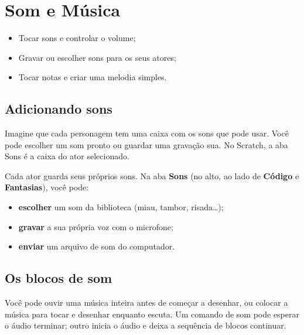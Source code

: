 \chapter{Som e Música}

\begin{objetivos}
\begin{itemize}
\item Tocar sons e controlar o volume;
\item Gravar ou escolher sons para os seus atores;
\item Tocar notas e criar uma melodia simples.
\end{itemize}
\end{objetivos}

\section{Adicionando sons}

\begin{pensaassim}
Imagine que cada personagem tem uma caixa com os sons que pode usar. Você pode escolher um som pronto ou guardar uma gravação sua. No Scratch, a aba Sons é a caixa do ator selecionado.
\end{pensaassim}

Cada ator guarda seus próprios sons. Na aba \textbf{Sons} (no alto, ao lado de \textbf{Código} e \textbf{Fantasias}), você pode:

\begin{itemize}
\item \textbf{escolher} um som da biblioteca (miau, tambor, risada\ldots);
\item \textbf{gravar} a sua própria voz com o microfone;
\item \textbf{enviar} um arquivo de som do computador.
\end{itemize}

\section{Os blocos de som}

\begin{pensaassim}
Você pode ouvir uma música inteira antes de começar a desenhar, ou colocar a música para tocar e desenhar enquanto escuta. Um comando de som pode esperar o áudio terminar; outro inicia o áudio e deixa a sequência de blocos continuar.
\end{pensaassim}

